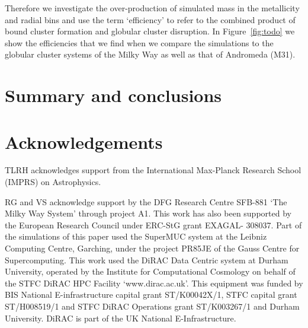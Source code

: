 \documentclass[a4paper,fleqn,usenatbib]{mnras}
\begin{document}
Therefore we investigate the over-production of simulated mass in the metallicity
and radial bins and use the term `efficiency' to refer to the combined product
of bound cluster formation and globular cluster disruption. In Figure~\ref{fig:todo}
we show the efficiencies that we find when we compare the simulations to the
globular cluster systems of the Milky Way as well as that of Andromeda (M31).




\section{Summary and conclusions}
\label{sec:conclusions}


\section*{Acknowledgements}
TLRH acknowledges support from the International Max-Planck Research School (IMPRS) on Astrophysics.


RG and VS acknowledge support by the DFG Research Centre SFB-881 `The
Milky Way System' through project A1. This work has also been
supported by the European Research Council under ERC-StG grant
EXAGAL- 308037. Part of the simulations of this paper used the
SuperMUC system at the Leibniz Computing Centre, Garching,
under the project PR85JE of the Gauss Centre for Supercomputing.
This work used the DiRAC Data Centric system at Durham
University, operated by the Institute for Computational Cosmology
on behalf of the STFC DiRAC HPC Facility `www.dirac.ac.uk'.
This equipment was funded by BIS National E-infrastructure capital
grant ST/K00042X/1, STFC capital grant ST/H008519/1 and
STFC DiRAC Operations grant ST/K003267/1 and Durham University.
DiRAC is part of the UK National E-Infrastructure.







\end{document}
